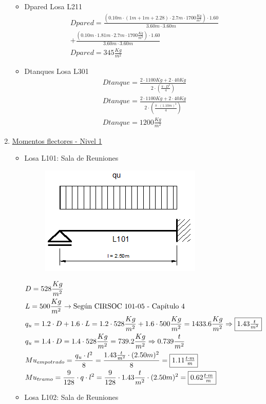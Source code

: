 \begin{enumerate}
\begin{itemize}
\item Dpared Losa L211
\begin{align*}
& Dpared = \frac{(0.10m \cdot (1m+1m+2.28) \cdot 2.7m \cdot 1700 \frac{Kg}{m^3}) \cdot 1.60}{3.60m \cdot 3.60m}\\
& + \frac{(0.10m \cdot 1.81m \cdot 2.7m \cdot 1700 \frac{Kg}{m^3}) \cdot 1.60}{3.60m \cdot 3.60m}\\
& Dpared = 345 \frac{Kg}{m^2}
\end{align*}

\item Dtanques Losa L301
\begin{align*}
& Dtanque = \frac{2 \cdot 1100Kg + 2 \cdot 40Kg}{2 \cdot (\frac{\pi \cdot D^2}{4})} \\
& Dtanque = \frac{2 \cdot 1100Kg + 2 \cdot 40Kg}{2 \cdot (\frac{\pi \cdot (1.10m)^2}{4})} \\
& Dtanque = 1200 \frac{Kg}{m^2}
\end{align*}
\end{itemize}

\item \underline{Momentos flectores - Nivel 1}\\
\begin{itemize}
\item Losa L101: Sala de Reuniones

\begin{figure}[H]
\begin{center}
     \includegraphics[scale = 0.8]{chapters/chapter_1/images/l101.png}
\end{center}
\end{figure}
\begin{align*}
& D = 528 \frac{Kg}{m^2}\\
& L = 500 \frac{Kg}{m^2} \rightarrow \text{Según CIRSOC 101-05 - Capítulo 4}\\
& q_u = 1.2 \cdot D + 1.6 \cdot L = 1.2 \cdot 528 \frac{Kg}{m^2} + 1.6 \cdot 500 \frac{Kg}{m^2} = 1433.6 \frac{Kg}{m^2} \Rightarrow \framebox{$1.43 \frac{t}{m^2}$} \\
& q_u = 1.4 \cdot D = 1.4 \cdot 528 \frac{Kg}{m^2} = 739.2 \frac{Kg}{m^2} \Rightarrow 0.739 \frac{t}{m^2}\\
& Mu_{empotrado} = \frac{q_u \cdot l^2}{8} = \frac{1.43 \frac{t}{m^2} \cdot (2.50m)^2}{8} = \framebox{$1.11 \frac{t \cdot m}{m}$}\\
& Mu_{tramo} = \frac{9}{128} \cdot q \cdot l^2 = \frac{9}{128} \cdot 1.43 \frac{t}{m^2} \cdot (2.50m)^2 = \framebox{$0.62 \frac{t \cdot m}{m}$}
\end{align*}
\newpage
\item Losa L102: Sala de Reuniones


\end{itemize}
\end{enumerate}
